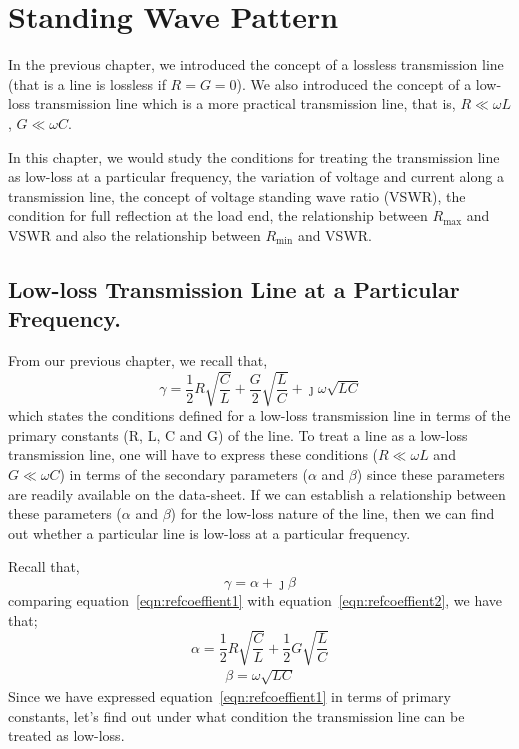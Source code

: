 \chapter{Standing Wave Pattern}\label{lec:lec5}
In the previous chapter, we introduced the concept of a lossless transmission line (that is a line is lossless if $R=G=0$). We also introduced the concept of a low-loss transmission line which is a more practical transmission line, that is, $R \ll \omega L$, $G \ll \omega C $.

In this chapter, we would study the conditions for treating the transmission line as low-loss at a particular frequency, the variation of voltage and current along a transmission line, the concept of voltage standing wave ratio (VSWR), the condition for full reflection at the load end, the relationship between $R_{\max}$ and VSWR and also the relationship between $R_{\min}$ and VSWR.

\section{Low-loss Transmission Line at a Particular Frequency.}
From our previous chapter, we recall that,
\begin{equation}
\gamma = \frac{1}{2}R\sqrt{\frac{C}{L}} + \frac{G}{2}\sqrt{\frac{L}{C}} +\jmath\omega\sqrt{LC}
\label{eqn:refcoeffient1}
\end{equation}
which states the conditions defined for a low-loss transmission line in terms of the primary constants (R, L, C and G) of the line. To treat a line as a low-loss transmission line, one will have to express these conditions ($R \ll \omega L$ and $G \ll \omega C$) in terms of the secondary parameters ($\alpha$ and $\beta $) since these parameters are readily available on the data-sheet. If we can establish a relationship between these parameters ($\alpha$ and $\beta $) for the low-loss nature of the line, then we can find out whether a particular line is low-loss at a particular frequency.

Recall that,
\begin{equation}
\gamma = \alpha + \jmath\beta
\label{eqn:refcoeffient2}
\end{equation}
comparing equation~\ref{eqn:refcoeffient1} with equation~\ref{eqn:refcoeffient2}, we have that;
\begin{equation}
\alpha = \frac{1}{2}R\sqrt{\frac{C}{L}} + \frac{1}{2}G\sqrt{\frac{L}{C}}	
\label{eqn:attenconst}
\end{equation}
\begin{align}
\beta = \omega\sqrt{LC}
\end{align}
Since we have expressed equation~\ref{eqn:refcoeffient1} in terms of primary constants, let's find out under what condition the transmission line can be treated as low-loss.


